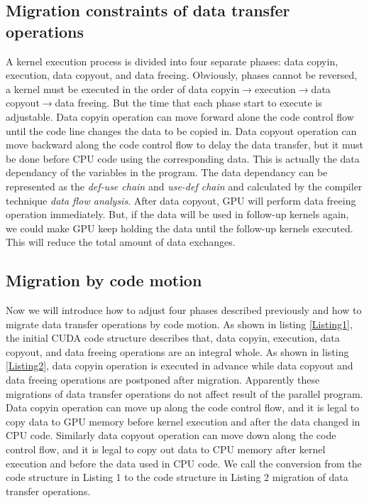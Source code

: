 \documentclass[10pt,conference]{IEEEtran}
\begin{document}
\subsection{Migration constraints of data transfer operations}
A kernel execution process is divided into four separate phases: data copyin, execution, data copyout, and data freeing. Obviously, phases cannot be reversed, a kernel must be executed in the order of data copyin$\rightarrow$execution$\rightarrow$data copyout$\rightarrow$data freeing. But the time that each phase start to execute is adjustable. Data copyin operation can move forward alone the code control flow until the code line changes the data to be copied in. Data copyout operation can move backward along the code control flow to delay the data transfer, but it must be done before CPU code using the corresponding data. This is actually the data dependancy of the variables in the program. The data dependancy can be represented as the \textit{def-use chain} and \textit{use-def chain} and calculated by the compiler technique \emph{data flow analysis}.  After data copyout, GPU will perform data freeing operation immediately. But, if the data will be used in follow-up kernels again, we could make GPU keep holding the data until the follow-up kernels executed. This will reduce the total amount of data exchanges.

\subsection{Migration by code motion}
Now we will introduce how to adjust four phases described previously and how to migrate data transfer operations by code motion. As shown in listing \ref{Listing1}, the initial CUDA code structure describes that, data copyin, execution, data copyout, and data freeing operations are an integral whole. As shown in listing \ref{Listing2}, data copyin operation is executed in advance while data copyout and data freeing operations are postponed after migration. Apparently these migrations of data transfer operations do not affect result of the parallel program. Data copyin operation can move up along the code control flow, and it is legal to copy data to GPU memory before kernel execution and after the data changed in CPU code. Similarly data copyout operation can move down along the code control flow, and it is legal to copy out data to CPU memory after kernel execution and before the data used in CPU code. We call the conversion from the code structure in Listing 1 to the code structure in Listing 2 migration of data transfer operations.
\end{document}
